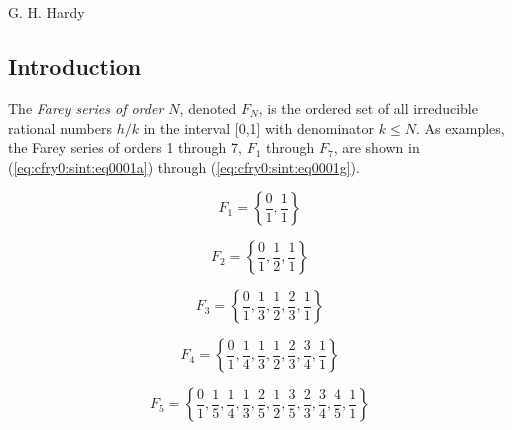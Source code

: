 \chapter{\cfryzerolongtitle{}}

\label{cfry0}

                   {G. H. Hardy \cite[p.85]{bibref:b:mathematiciansapology:1940}}

\section{Introduction}
\label{cfry0:sint}

The \emph{Farey series
of order $N$}, denoted $F_{N}$,
is the ordered set of all irreducible
rational numbers $h/k$ in the interval
[0,1]
with denominator $k\leq N$.
As examples, the Farey series of
orders 1 through 7, $F_1$ through $F_7$, are shown
in (\ref{eq:cfry0:sint:eq0001a}) through (\ref{eq:cfry0:sint:eq0001g}).

\begin{equation}
\label{eq:cfry0:sint:eq0001a}
F_1  = \left\{ {\frac{0}{1},\frac{1}{1}} \right\}
\end{equation}

\begin{equation}
\label{eq:cfry0:sint:eq0001b}
F_2  = \left\{ {\frac{0}{1},\frac{1}{2},\frac{1}{1}} \right\}
\end{equation}

\begin{equation}
\label{eq:cfry0:sint:eq0001c}
F_3  = \left\{ {\frac{0}{1},\frac{1}{3},\frac{1}{2},
                \frac{2}{3},\frac{1}{1}} \right\}
\end{equation}

\begin{equation}
\label{eq:cfry0:sint:eq0001d}
F_4  = \left\{ {\frac{0}{1},\frac{1}{4},
                \frac{1}{3},\frac{1}{2},
                \frac{2}{3},\frac{3}{4},
                \frac{1}{1}} \right\}
\end{equation}

\begin{equation}
\label{eq:cfry0:sint:eq0001e}
F_5  = \left\{ {\frac{0}{1},\frac{1}{5},\frac{1}{4},
                \frac{1}{3},\frac{2}{5},\frac{1}{2},
                \frac{3}{5},\frac{2}{3},\frac{3}{4},
                \frac{4}{5},\frac{1}{1}} \right\}
\end{equation}

